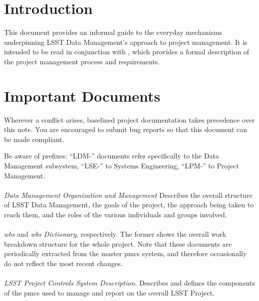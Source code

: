 \section{Introduction}

This document provides an informal guide to the everyday mechanisms underpinning LSST Data Management's approach to project management.
It is intended to be read in conjunction with , which provides a formal description of the project management process and requirements.

\section{Important Documents}
\label{sec:documents}

Wherever a conflict arises, baselined project documentation takes precedence over this note.
You are encouraged to submit bug reports so that this document can be made compliant.

Be aware of prefixes: ``LDM-'' documents refer specifically to the Data Management subsystem, ``LSE-'' to Systems Engineering, ``LPM-'' to Project Management.

\paragraph*{}
\emph{Data Management Organization and Management}
Describes the overall structure of LSST Data Management, the goals of the project, the approach being taken to reach them, and the roles of the various individuals and groups involved.

\paragraph*{}
\emph{\gls{wbs}} and \emph{\gls{wbs} Dictionary}, respectively.
The former shows the overall work breakdown structure for the whole project.
Note that these documents are periodically extracted from the master \gls{pmcs} system, and therefore occasionally do not reflect the most recent changes.

\paragraph*{}
\emph{LSST Project Controls System Description}.
Describes and defines the components of the \gls{pmcs} used to manage and report on the overall LSST Project.

